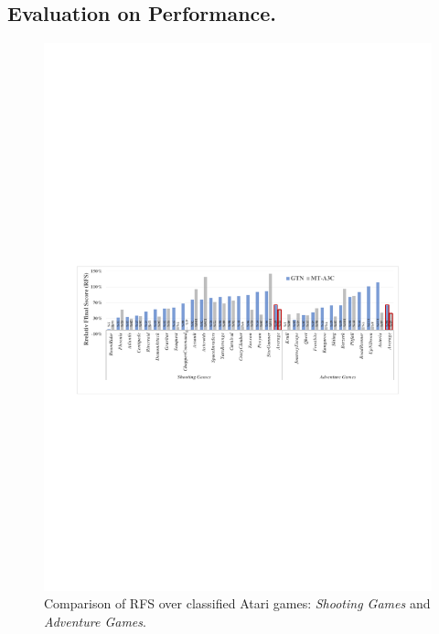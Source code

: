 \documentclass[letterpaper]{article} %
\begin{document}
\subsection{Evaluation on Performance.}

\begin{figure}
	\begin{center}
		\centerline{\includegraphics[width=\columnwidth]{figure/figure-resn-1}}
		\caption{
                Comparison of RFS over classified Atari games: \textit{Shooting Games} and \textit{Adventure Games}.
            }
		\label{figure-resn-1}
	\end{center}
\end{figure}
\end{document}
